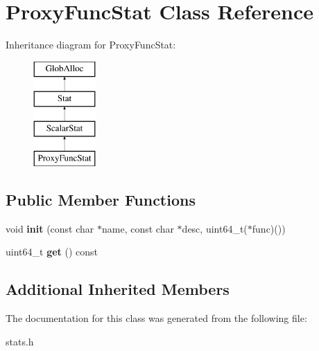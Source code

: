 \hypertarget{classProxyFuncStat}{\section{Proxy\-Func\-Stat Class Reference}
\label{classProxyFuncStat}
}
Inheritance diagram for Proxy\-Func\-Stat\-:\begin{figure}[H]
\begin{center}
\leavevmode
\includegraphics[height=4.000000cm]{classProxyFuncStat}
\end{center}
\end{figure}
\subsection*{Public Member Functions}
\begin{DoxyCompactItemize}
\item 
\hypertarget{classProxyFuncStat_ae2a77949c4e412fbecd19d96b62471a3}{void {\bfseries init} (const char $\ast$name, const char $\ast$desc, uint64\-\_\-t($\ast$func)())}\label{classProxyFuncStat_ae2a77949c4e412fbecd19d96b62471a3}

\item 
\hypertarget{classProxyFuncStat_ab5e47a48ff5b8d190f8fe87d72bb6020}{uint64\-\_\-t {\bfseries get} () const }\label{classProxyFuncStat_ab5e47a48ff5b8d190f8fe87d72bb6020}

\end{DoxyCompactItemize}
\subsection*{Additional Inherited Members}


The documentation for this class was generated from the following file\-:\begin{DoxyCompactItemize}
\item 
stats.\-h\end{DoxyCompactItemize}
